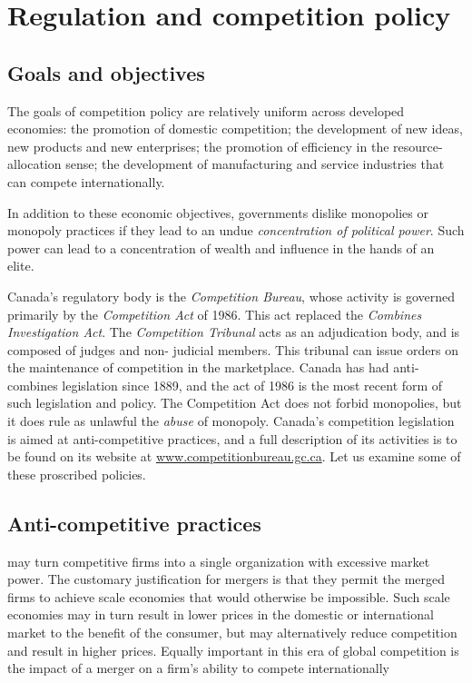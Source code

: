 \section{Regulation and competition policy} \label{sec:regulation}
 
\subsection*{Goals and objectives}

The goals of competition policy are relatively uniform across developed economies: the promotion of domestic competition; the development of new ideas, new products and new enterprises; the promotion of efficiency in the resource-allocation sense; the development of manufacturing and service industries that can compete internationally.

In addition to these economic objectives, governments dislike monopolies or monopoly practices if they lead to an undue \textit{concentration of political power}. Such power can lead to a concentration of wealth and influence in the hands of an elite.

Canada's regulatory body is the \textit{Competition Bureau}, whose activity is governed primarily by the \textit{Competition Act} of 1986. This act replaced the \textit{Combines Investigation Act}. The \textit{Competition Tribunal} acts as an adjudication body, and is composed of judges and non- judicial members. This tribunal can issue orders on the maintenance of competition in the marketplace. Canada has had anti-combines legislation since 1889, and the act of 1986 is the most recent form of such legislation and policy. The Competition Act does not forbid monopolies, but it does rule as unlawful the \textit{abuse} of monopoly. Canada's competition legislation is aimed at anti-competitive practices, and a full description of its activities is to be found on its website at \href{www.competitionbureau.gc.ca}{www.competitionbureau.gc.ca}. Let us examine some of these proscribed policies.

\subsection*{Anti-competitive practices}

 may turn competitive firms into a single organization with excessive market power. The customary justification for mergers is that they permit the merged firms to achieve scale economies that would otherwise be impossible. Such scale economies may in turn result in lower prices in the domestic or international market to the benefit of the consumer, but may alternatively reduce competition and result in higher prices. Equally important in this era of global competition is the impact of a merger on a firm's ability to compete internationally

